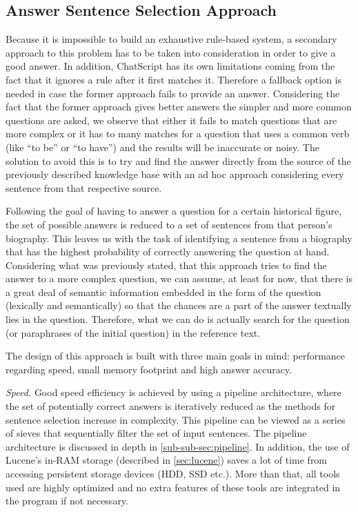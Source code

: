 \subsection{Answer Sentence Selection Approach}
\label{sub-sec:impl-ca-ass}

Because it is impossible to build an exhaustive rule-based system, a secondary approach to this problem has to be taken into consideration in order to give a good answer. In addition, ChatScript has its own limitations coming from the fact that it ignores a rule after it first matches it. Therefore a fallback option is needed in case the former approach fails to provide an answer.
Considering the fact that the former approach gives better answers the simpler and more common questions are asked, we observe that either it fails to match questions that are more complex or it has to many matches for a question that uses a common verb (like “to be” or “to have”) and the results will be inaccurate or noisy. The solution to avoid this is to try and find the answer directly from the source of the previously described knowledge base with an ad hoc approach considering every sentence from that respective source.

Following the goal of having to answer a question for a certain historical figure, the set of possible answers is reduced to a set of sentences from that person's biography.
This leaves us with the task of identifying a sentence from a biography that has the highest probability of correctly answering the question at hand.
Considering what was previously stated, that this approach tries to find the answer to a more complex question, we can assume, at least for now, that there is a great deal of semantic information embedded in the form of the question (lexically and semantically) so that the chances are a part of the answer textually lies in the question. Therefore, what we can do is actually search for the question (or paraphrases of the initial question) in the reference text.

The design of this approach is built with three main goals in mind: performance regarding speed, small memory footprint and high answer accuracy.

{\em Speed.} Good speed efficiency is achieved by using a pipeline architecture, where the set of potentially correct answers is iteratively reduced as the methods for sentence selection increase in complexity. This pipeline can be viewed as a series of sieves that sequentially filter the set of input sentences. The pipeline architecture is discussed in depth in \autoref{sub-sub-sec:pipeline}. In addition, the use of Lucene's in-RAM storage (described in \autoref{sec:lucene}) saves a lot of time from accessing persistent storage devices (HDD, SSD etc.). More than that, all tools used are highly optimized and no extra features of these tools are integrated in the program if not necessary.

